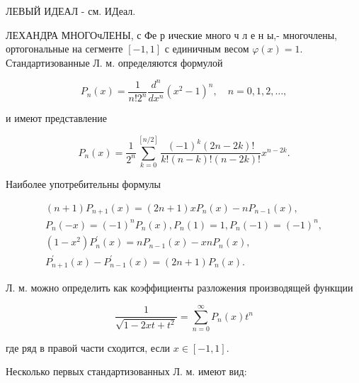 \documentclass[10pt]{article}
\begin{document}
ЛЕВЫЙ ИДЕАЛ - см. ИДеал.



ЛЕХАНДРА МНОГОчЛЕНЫ, с Фе р ические много ч л е н ы,- многочлены, ортогональные на сегменте $[-1,1]$ с единичным весом $\varphi(x)=1$. Стандартизованные Л. м. определяются формулой



\[

P_{n}(x)=\frac{1}{n ! 2^{n}} \frac{d^{n}}{d x^{n}}\left(x^{2}-1\right)^{n}, \quad n=0,1,2, \ldots,

\]



и имеют представление



\[

P_{n}(x)=\frac{1}{2^{n}} \sum_{k=0}^{[n / 2]} \frac{(-1)^{k}(2 n-2 k) !}{k !(n-k) !(n-2 k) !} x^{n-2 k} .

\]



Наиболее употребительны формулы



\[

\begin{gathered}

(n+1) P_{n+1}(x)=(2 n+1) x P_{n}(x)-n P_{n-1}(x), \\

P_{n}(-x)=(-1)^{n} P_{n}(x), P_{n}(1)=1, P_{n}(-1)=(-1)^{n}, \\

\left(1-x^{2}\right) P_{n}^{\prime}(x)=n P_{n-1}(x)-x n P_{n}(x), \\

P_{n+1}^{\prime}(x)-P_{n-1}^{\prime}(x)=(2 n+1) P_{n}(x) .

\end{gathered}

\]



Л. м. можно определить как коэффициенты разложения производящей функщии



\[

\frac{1}{\sqrt{1-2 x t+t^{2}}}=\sum_{n=0}^{\infty} P_{n}(x) t^{n}

\]



где ряд в правой части сходится, если $x \in[-1,1]$.



Несколько первых стандартизованных Л. м. имеют вид:
\end{document}
